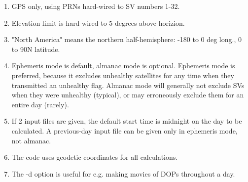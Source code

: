 \begin{enumerate}
\item GPS only, using PRNs hard-wired to SV numbers 1-32.
\item Elevation limit is hard-wired to 5 degrees above horizion.
\item "North America" means the northern half-hemisphere: -180 to 0 deg long.,
      0 to 90N latitude.
\item Ephemeris mode is default, almanac mode is optional.  Ephemeris mode is
      preferred, because it excludes unhealthy satellites for any time when they
      transmitted an unhealthy flag.  Almanac mode will generally not exclude SVs
      when they were unhealthy (typical), or may erroneously exclude them for an
      entire day (rarely).
\item If 2 input files are given, the default start time is midnight on the day
      to be calculated.  A previous-day input file can be given only in ephemeris
      mode, not almanac.
\item The code uses geodetic coordinates for all calculations.
\item The -d option is useful for e.g. making movies of DOPs throughout a day.
\end{enumerate}
%

